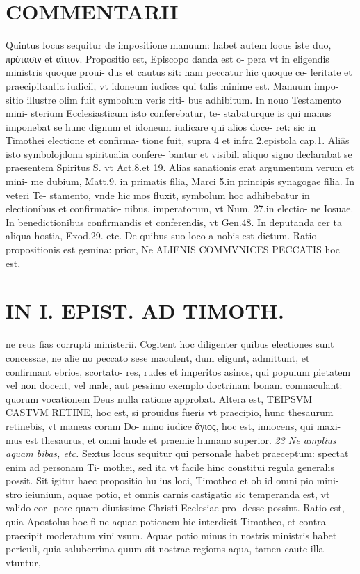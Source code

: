 \documentclass{article}
\begin{document}
\begin{pages}
\section*{COMMENTARII }
\marginpar{[ p.138 ]}\pstart Quintus locus sequitur de impositione manuum: habet autem locus iste duo, πρότασιν et αἴτιον. Propositio est, Episcopo danda est o- pera vt in eligendis ministris quoque proui- dus et cautus sit: nam peccatur hic quoque ce- leritate et praecipitantia iudicii, vt idoneum iudices qui talis minime est. Manuum impo- sitio illustre olim fuit symbolum veris riti- bus adhibitum. In nouo Testamento mini- sterium Ecclesiasticum isto conferebatur, te- stabaturque is qui manus imponebat se hunc dignum et idoneum iudicare qui alios doce- ret: sic in Timothei electione et confirma- tione fuit, supra 4 et infra 2.epistola cap.1. Aliâs isto symbolojdona spiritualia confere- bantur et visibili aliquo signo declarabat se praesentem Spiritus S. vt Act.8.et 19. Alias sanationis erat argumentum verum et mini- me dubium, Matt.9. in primatis filia, Marci 5.in principis synagogae filia. In veteri Te- stamento, vnde hic mos fluxit, symbolum hoc adhibebatur in electionibus et confirmatio- nibus, imperatorum, vt Num. 27.in electio- ne Iosuae. In benedictionibus confirmandis et conferendis, vt Gen.48. In deputanda cer ta aliqua hostia, Exod.29. etc. De quibus suo loco a nobis est dictum.  \pend\pstart Ratio propositionis est gemina: prior, Ne ALIENIS COMMVNICES PECCATIS hoc est,  \pend
\section*{IN I. EPIST. AD TIMOTH. }
\marginpar{[ p.139 ]}\pstart ne reus fias corrupti ministerii. Cogitent hoc diligenter quibus electiones sunt concessae, ne alie no peccato sese maculent, dum eligunt, admittunt, et confirmant ebrios, scortato- res, rudes et imperitos asinos, qui populum pietatem vel non docent, vel male, aut pessimo exemplo doctrinam bonam conmaculant: quorum vocationem Deus nulla ratione approbat.  \pend\pstart Altera est, TEIPSVM CASTVM RETINE, hoc est, si prouidus fueris vt praecipio, hunc thesaurum retinebis, vt maneas coram Do- mino iudice ἅγιος, hoc est, innocens, qui maxi- mus est thesaurus, et omni laude et praemie humano superior.  \pend
\textit{23 Ne amplius aquam bibas, etc. }\pstart Sextus locus sequitur qui personale habet praeceptum: spectat enim ad personam Ti- mothei, sed ita vt facile hinc constitui regula generalis possit. Sit igitur haec propositio hu ius loci, Timotheo et ob id omni pio mini- stro ieiunium, aquae potio, et omnis carnis castigatio sic temperanda est, vt valido cor- pore quam diutissime Christi Ecclesiae pro- desse possint. Ratio est, quia Apostolus hoc fi ne aquae potionem hic interdicit Timotheo, et contra praecipit moderatum vini vsum. Aquae potio minus in nostris ministris habet periculi, quia saluberrima quum sit nostrae regioms aqua, tamen caute illa vtuntur,  \pend

\end{pages}
\end{document}
